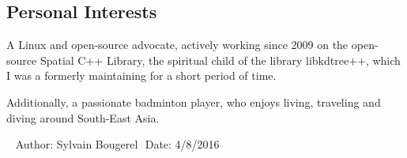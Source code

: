 \documentclass[overlapped,line,letterpaper]{res}
\begin{document}
\begin{resume}

  \section{\bf Personal Interests}

  A Linux and open-source advocate, actively working since 2009 on the
  open-source Spatial C++ Library, the spiritual child of the library
  libkdtree++, which I was a formerly maintaining for a short period of time.

  Additionally, a passionate badminton player, who enjoys living, traveling and
  diving around South-East Asia.


  \begin{center}
    \vspace{\fill}\ \newline
           {\tiny \rm $ $Author: Sylvain Bougerel $ $ }
           {\tiny \rm $ $Date: 4/8/2016 $ $ }
  \end{center}

\end{resume}
\end{document}
